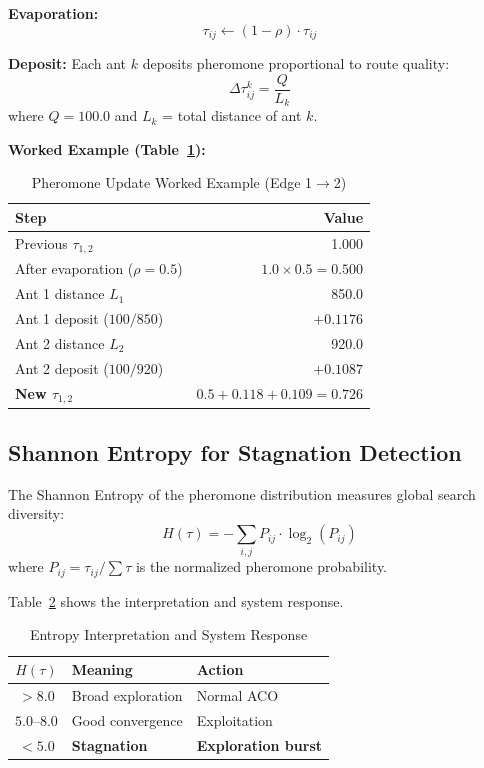 \documentclass[10pt,conference]{IEEEtran}
\begin{document}
\textbf{Evaporation:}
\begin{equation}
    \tau_{ij} \leftarrow (1 - \rho) \cdot \tau_{ij}
\end{equation}

\textbf{Deposit:} Each ant $k$ deposits pheromone proportional to route quality:
\begin{equation}
    \Delta\tau_{ij}^k = \frac{Q}{L_k}
\end{equation}
where $Q = 100.0$ and $L_k$ = total distance of ant $k$.

\textbf{Worked Example (Table~\ref{tab:phero_update}):}

\begin{table}[h]
\caption{Pheromone Update Worked Example (Edge 1$\rightarrow$2)}
\label{tab:phero_update}
\begin{center}
\begin{tabular}{|l|r|}
\hline
\textbf{Step} & \textbf{Value} \\
\hline
Previous $\tau_{1,2}$ & 1.000 \\
After evaporation ($\rho = 0.5$) & $1.0 \times 0.5 = 0.500$ \\
\hline
Ant 1 distance $L_1$ & 850.0 \\
Ant 1 deposit ($100/850$) & $+0.1176$ \\
Ant 2 distance $L_2$ & 920.0 \\
Ant 2 deposit ($100/920$) & $+0.1087$ \\
\hline
\textbf{New $\tau_{1,2}$} & $0.5 + 0.118 + 0.109 = \mathbf{0.726}$ \\
\hline
\end{tabular}
\end{center}
\end{table}

\subsection{Shannon Entropy for Stagnation Detection}
The Shannon Entropy of the pheromone distribution measures global search diversity:
\begin{equation}
    H(\tau) = - \sum_{i,j} P_{ij} \cdot \log_{2}(P_{ij})
\end{equation}
where $P_{ij} = \tau_{ij} / \sum \tau$ is the normalized pheromone probability.

Table~\ref{tab:entropy_interpret} shows the interpretation and system response.

\begin{table}[h]
\caption{Entropy Interpretation and System Response}
\label{tab:entropy_interpret}
\begin{center}
\begin{tabular}{|c|l|l|}
\hline
\textbf{$H(\tau)$} & \textbf{Meaning} & \textbf{Action} \\
\hline
$> 8.0$ & Broad exploration & Normal ACO \\
$5.0$--$8.0$ & Good convergence & Exploitation \\
$< 5.0$ & \textbf{Stagnation} & \textbf{Exploration burst} \\
\hline
\end{tabular}
\end{center}
\end{table}
\end{document}
